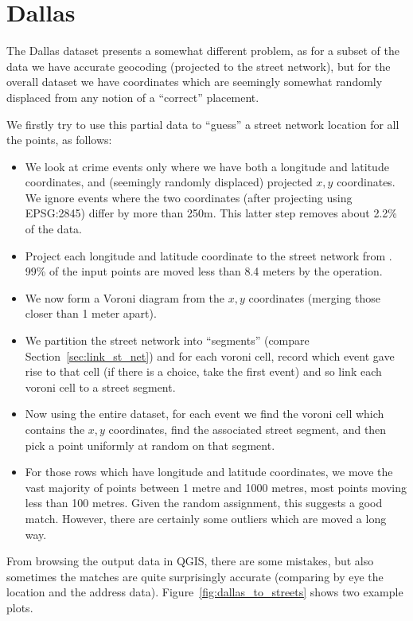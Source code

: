 \documentclass[twoside,a4paper,twocolumn,10pt]{article}
\theoremstyle{plain}
\theoremstyle{definition}
\begin{document}
\section{Dallas}\label{sec:dallas}

The Dallas dataset presents a somewhat different problem, as for a subset of the data we
have accurate geocoding (projected to the street network), but for the overall dataset we
have coordinates which are seemingly somewhat randomly displaced from any notion of a
``correct'' placement.

We firstly try to use this partial data to ``guess'' a street network location for all the
points, as follows:
\begin{itemize}
\item We look at crime events only where we have both a longitude and latitude coordinates,
  and (seemingly randomly displaced) projected $x,y$ coordinates.  We ignore events where the two
  coordinates (after projecting using EPSG:2845) differ by more than 250m.  This latter
  step removes about 2.2\% of the data.
\item Project each longitude and latitude coordinate to the street network from
  \cite{dstreets}.  99\% of the input points are moved less than 8.4 meters by the operation.
\item We now form a Voroni diagram from the $x,y$ coordinates (merging those closer than
  1 meter apart).
\item We partition the street network into ``segments'' (compare Section~\ref{sec:link_st_net})
  and for each voroni cell, record which event gave rise to that cell (if there is a choice,
  take the first event) and so link each voroni cell to a street segment.
\item Now using the entire dataset, for each event we find the voroni cell which contains
  the $x,y$ coordinates, find the associated street segment, and then pick a point uniformly
  at random on that segment.
\item For those rows which have longitude and latitude coordinates, we move the vast majority
  of points between 1 metre and 1000 metres, most points moving less than 100 metres.  Given
  the random assignment, this suggests a good match.  However, there are certainly some
  outliers which are moved a long way.
\end{itemize}

From browsing the output data in QGIS, there are some mistakes, but also sometimes the matches
are quite surprisingly accurate (comparing by eye the location and the address data).
Figure~\ref{fig:dallas_to_streets} shows two example plots.
\end{document}
